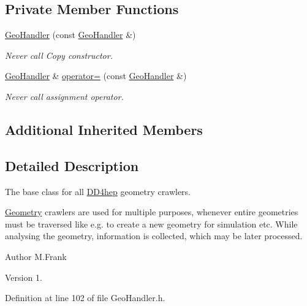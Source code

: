 \subsection*{Private Member Functions}
\begin{DoxyCompactItemize}
\item 
\hyperlink{class_d_d4hep_1_1_geometry_1_1_geo_handler_acade5475bb3291d079f7eda3daded0e7}{Geo\+Handler} (const \hyperlink{class_d_d4hep_1_1_geometry_1_1_geo_handler}{Geo\+Handler} \&)
\begin{DoxyCompactList}\small\item\em Never call Copy constructor. \end{DoxyCompactList}\item 
\hyperlink{class_d_d4hep_1_1_geometry_1_1_geo_handler}{Geo\+Handler} \& \hyperlink{class_d_d4hep_1_1_geometry_1_1_geo_handler_a477f807851e2177e48daa15e6d88d30e}{operator=} (const \hyperlink{class_d_d4hep_1_1_geometry_1_1_geo_handler}{Geo\+Handler} \&)
\begin{DoxyCompactList}\small\item\em Never call assignment operator. \end{DoxyCompactList}\end{DoxyCompactItemize}
\subsection*{Additional Inherited Members}


\subsection{Detailed Description}
The base class for all \hyperlink{namespace_d_d4hep}{D\+D4hep} geometry crawlers. 

\hyperlink{namespace_d_d4hep_1_1_geometry}{Geometry} crawlers are used for multiple purposes, whenever entire geometries must be traversed like e.\+g. to create a new geometry for simulation etc. While analysing the geometry, information is collected, which may be later processed.

\begin{DoxyAuthor}{Author}
M.\+Frank 
\end{DoxyAuthor}
\begin{DoxyVersion}{Version}
1. 
\end{DoxyVersion}


Definition at line 102 of file Geo\+Handler.\+h.



